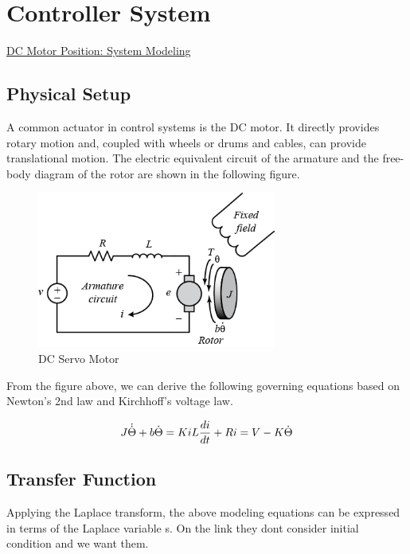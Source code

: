\section{Controller System}\label{sec:controller_sys}
\href{http://ctms.engin.umich.edu/CTMS/index.php?example=MotorPosition&section=SystemModeling}{DC Motor Position: System Modeling}

\subsection{Physical Setup}
A common actuator in control systems is the DC motor. It directly provides rotary motion and, coupled with wheels or drums and cables, can provide translational motion. The electric equivalent circuit of the armature and the free-body diagram of the rotor are shown in the following figure. 

\begin{figure}[h!]\label{fig:motor_model}
	\centering
	\includegraphics[width=0.7\textwidth]{figures/motor.png}
	\caption{DC Servo Motor}
\end{figure}

From the figure above, we can derive the following governing equations based on Newton's 2nd law and Kirchhoff's voltage law.

\begin{equation}
	J \dot{\dot{\Theta}} + b\dot{\Theta} = Ki \\
	L\frac{di}{dt} + Ri = V - K\dot{\Theta}
\end{equation}

\subsection{Transfer Function}
Applying the Laplace transform, the above modeling equations can be expressed in terms of the Laplace variable s. On the link they dont consider initial condition and we want them.

